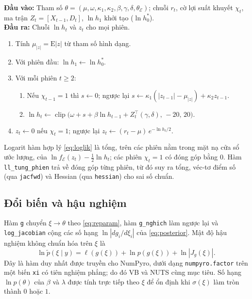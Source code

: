 \documentclass[12pt,a4paper]{article}
\newcounter{thuattoan}
\newenvironment{thuattoan}[1]{%
  \refstepcounter{thuattoan}%
  \begin{tcolorbox}[enhanced,breakable,colback=nenkhung,colframe=vienkhung,boxrule=0.5pt,arc=1mm,
    left=6pt,right=6pt,top=4pt,bottom=4pt,
    title={\textbf{Thuật toán \thethuattoan.} #1},coltitle=black,colbacktitle=nenkhung!60!vienkhung!25]%
  \small
}{\end{tcolorbox}}
\theoremstyle{remark}
\newcommand{\E}{\mathrm{E}}
\newcommand{\Ecal}{\mathcal{E}}
\newcommand{\ma}[1]{\texttt{\small #1}}
\begin{document}
\begin{thuattoan}{Đệ quy lọc $\ln h_t$ và $z_t$ của EGARCH-X}
\textbf{Đầu vào:} Tham số $\theta=(\mu,\omega,\kappa_1,\kappa_2,\beta,\gamma,\delta,\theta_{\mathcal E})$; chuỗi $r_t$, cờ lợi suất khuyết $\chi_t$, ma trận $Z_t=[X_{t-1},D_t]$, $\ln h_1$ khởi tạo ($\ln h_0^{*}$).\\
\textbf{Đầu ra:} Chuỗi $\ln h_t$ và $z_t$ cho mọi phiên.
\begin{enumerate}
\item Tính $\mu_{|z|}=\E|z|$ từ tham số hình dạng.
\item Với phiên đầu: $\ln h_1\leftarrow\ln h_0^{*}$.
\item Với mỗi phiên $t\ge2$:
 \begin{enumerate}
 \item Nếu $\chi_{t-1}=1$ thì $s\leftarrow0$; ngược lại $s\leftarrow\kappa_1(|z_{t-1}|-\mu_{|z|})+\kappa_2 z_{t-1}$.
 \item $\ln h_t\leftarrow\operatorname{clip}\big(\omega+s+\beta\ln h_{t-1}+Z_t^\top(\gamma,\delta),\,-20,\,20\big)$.
 \end{enumerate}
\item $z_t\leftarrow0$ nếu $\chi_t=1$; ngược lại $z_t\leftarrow(r_t-\mu)\,e^{-\ln h_t/2}$.
\end{enumerate}
\end{thuattoan}

Logarit hàm hợp lý \eqref{eq:loglik} là tổng, trên các phiên nằm trong mặt nạ cửa sổ ước lượng, của $\ln f_\Ecal(z_t)-\tfrac12\ln h_t$; các phiên $\chi_t=1$ có đóng góp bằng $0$. Hàm \ma{ll\_tung\_phien} trả về đóng góp từng phiên, từ đó suy ra tổng, véc-tơ điểm số (qua \ma{jacfwd}) và Hessian (qua \ma{hessian}) cho sai số chuẩn.

\subsection{Đổi biến và hậu nghiệm}

Hàm \ma{g} chuyển $\xi\to\theta$ theo \eqref{eq:reparam}, hàm \ma{g\_nghich} làm ngược lại và \ma{log\_jacobian} cộng các số hạng $\ln|d g_i/d\xi_i|$ của \eqref{eq:posterior}. Mật độ hậu nghiệm không chuẩn hóa trên $\xi$ là
\begin{equation}
\ln\tilde p(\xi\mid y)=\ell(g(\xi))+\ln p(g(\xi))+\ln|J_g(\xi)| .
\end{equation}
Đây là hàm duy nhất được truyền cho NumPyro, dưới dạng \ma{numpyro.factor} trên một biến \ma{xi} có tiên nghiệm phẳng; do đó VB và NUTS cùng mục tiêu. Số hạng $\ln p(\theta)$ của $\beta$ và $\lambda$ được tính trực tiếp theo $\xi$ để ổn định khi $\sigma(\xi)$ làm tròn thành $0$ hoặc $1$.
\end{document}
